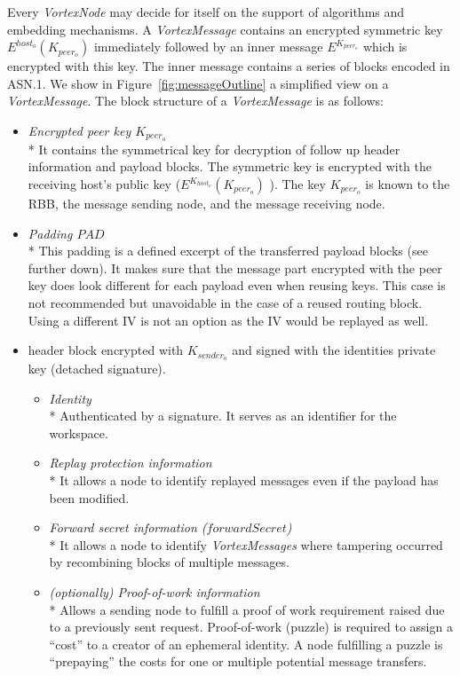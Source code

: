 \documentclass[acmsmall, screen, final, natbib=false]{acmart}
\begin{document}
	Every \emph{VortexNode} may decide for itself on the support of algorithms and embedding mechanisms. A \emph{VortexMessage} contains an encrypted symmetric key $E^{host_o}\left(K_{peer_o}\right)$ immediately followed by an inner message $E^{K_{peer_o}}$ which is encrypted with this key. The inner message contains a series of blocks encoded in ASN.1. We show in Figure~\ref{fig:messageOutline} a simplified view on a \emph{VortexMessage}. The block structure of a \emph{VortexMessage} is as follows:
	\begin{itemize}
		\item \emph{Encrypted peer key $K_{peer_o}$}\\*
		It contains the symmetrical key for decryption of follow up header information and payload blocks. The symmetric key is encrypted with the receiving host's public key ($E^{K_{host_o}}\left(K_{peer_o}\right)$ ). The key $K_{peer_o}$ is known to the RBB, the message sending node, and the message receiving node.
		\item \emph{Padding $PAD$}\\*
		This padding is a defined excerpt of the transferred payload blocks (see further down). It makes sure that the message part encrypted with the peer key does look different for each payload even when reusing keys. This case is not recommended but unavoidable in the case of a reused routing block. Using a different IV is not an option as the IV would be replayed as well.
		\item header block encrypted with $K_{sender_o}$ and signed with the identities private key (detached signature).
		\begin{itemize}
			\item \emph{Identity}\\*
			Authenticated by a signature. It serves as an identifier for the workspace.
			\item \emph{Replay protection information}\\*
			It allows a node to identify replayed messages even if the payload has been modified.
			\item \emph{Forward secret information ($forwardSecret$)}\\*
			It allows a node to identify \emph{VortexMessages} where tampering occurred by recombining blocks of multiple messages.      
			\item \emph{(optionally) Proof-of-work information}\\*
			Allows a sending node to fulfill a proof of work requirement raised due to a previously sent request. Proof-of-work (puzzle) is required to assign a ``cost'' to a creator of an ephemeral identity. A node fulfilling a puzzle is ``prepaying'' the costs for one or multiple potential message transfers. 

\end{itemize}
\end{itemize}
\end{document}
